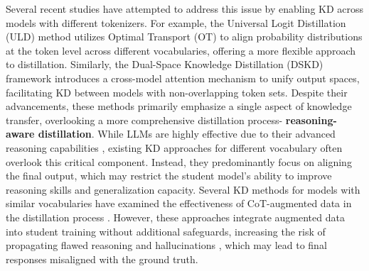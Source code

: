 Several recent studies have attempted to address this issue by enabling KD across models with different tokenizers. For example, the Universal Logit Distillation (ULD) method \cite{boizard2024towards} utilizes Optimal Transport (OT) to align probability distributions at the token level across different vocabularies, offering a more flexible approach to distillation. Similarly, the Dual-Space Knowledge Distillation (DSKD) framework \citep{zhang2024dual} introduces a cross-model attention mechanism to unify output spaces, facilitating KD between models with non-overlapping token sets. Despite their advancements, these methods primarily emphasize a single aspect of knowledge transfer, overlooking a more comprehensive distillation process- \textbf{reasoning-aware distillation}. While LLMs are highly effective due to their advanced reasoning capabilities \citep{wei2022chain, huang2023towards, guo2025deepseek}, existing KD approaches for different vocabulary often overlook this critical component. Instead, they predominantly focus on aligning the final output, which may restrict the student model’s ability to improve reasoning skills and generalization capacity. Several KD methods for models with similar vocabularies have examined the effectiveness of CoT-augmented data in the distillation process \citep{ho2022large, hsieh2023distilling, ranaldi2024aligning}. However, these approaches integrate augmented data into student training without additional safeguards, increasing the risk of propagating flawed reasoning and hallucinations \citep{tonmoy2024comprehensive}, which may lead to final responses misaligned with the ground truth.

    

